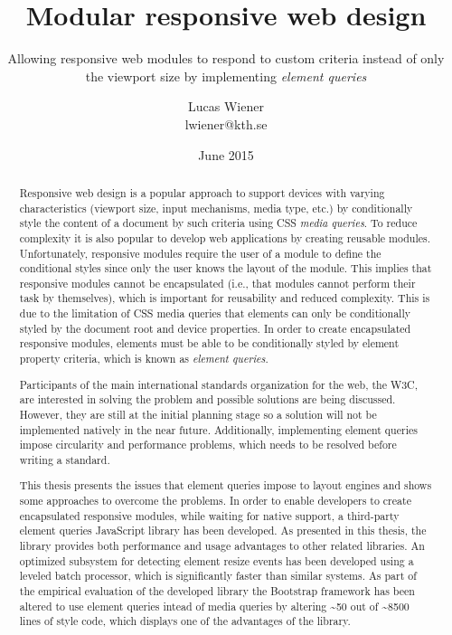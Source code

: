 \documentclass[a4paper,11pt]{kth-mag}
\title{Modular responsive web design}
\subtitle{Allowing responsive web modules to respond to custom criteria instead of only the viewport size by implementing \emph{element queries}}
\author{Lucas Wiener \\ \lowercase{lwiener@kth.se}}
\date{June 2015}
\begin{document}
  \frontmatter
  \pagestyle{empty}
  \removepagenumbers
  \maketitle
  \begin{abstract}
    Responsive web design is a popular approach to support devices with varying characteristics (viewport size, input mechanisms, media type, etc.) by conditionally style the content of a document by such criteria using CSS \emph{media queries}.
    To reduce complexity it is also popular to develop web applications by creating reusable modules.
    Unfortunately, responsive modules require the user of a module to define the conditional styles since only the user knows the layout of the module.
    This implies that responsive modules cannot be encapsulated (i.e., that modules cannot perform their task by themselves), which is important for reusability and reduced complexity.
    This is due to the limitation of CSS media queries that elements can only be conditionally styled by the document root and device properties.
    In order to create encapsulated responsive modules, elements must be able to be conditionally styled by element property criteria, which is known as \emph{element queries}.

    Participants of the main international standards organization for the web, the W3C, are interested in solving the problem and possible solutions are being discussed.
    However, they are still at the initial planning stage so a solution will not be implemented natively in the near future.
    Additionally, implementing element queries impose circularity and performance problems, which needs to be resolved before writing a standard.

    This thesis presents the issues that element queries impose to layout engines and shows some approaches to overcome the problems.
    In order to enable developers to create encapsulated responsive modules, while waiting for native support, a third-party element queries JavaScript library has been developed.
    As presented in this thesis, the library provides both performance and usage advantages to other related libraries.
    An optimized subsystem for detecting element resize events has been developed using a leveled batch processor, which is significantly faster than similar systems.
    As part of the empirical evaluation of the developed library the Bootstrap framework has been altered to use element queries intead of media queries by altering \textasciitilde50 out of \textasciitilde8500 lines of style code, which displays one of the advantages of the library.

  \end{abstract}
\end{document}
